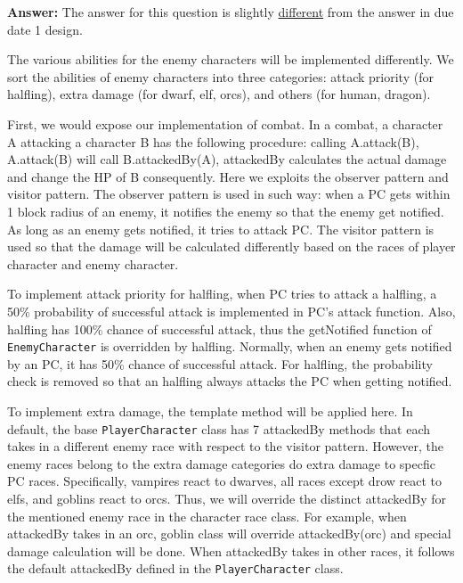 \documentclass[11pt]{article}
\theoremstyle{plain} \newtheorem{theorem*}{Theorem}[subsection]
\begin{document}
\textbf{Answer:}
The answer for this question is slightly \underline{different} from the answer 
in due date 1 design. 

The various abilities for the enemy characters will be implemented differently.
We sort the abilities of enemy characters into three categories: attack
priority (for halfling), extra damage (for dwarf, elf, orcs), and others (for
human, dragon).  

First, we would expose our implementation of combat. In a combat, a character A
attacking a character B has the following procedure: calling A.\textsf{attack}(B),
A.\textsf{attack}(B) will call B.\textsf{attackedBy}(A), \textsf{attackedBy} 
calculates the actual damage and change the HP of B consequently. Here we 
exploits the observer pattern and visitor pattern. The observer pattern is used 
in such way: when a PC gets within 1 block radius of an enemy, it notifies the 
enemy so that the enemy get notified. As long as an enemy gets notified, it 
tries to attack PC. The visitor pattern is used so that the damage will be 
calculated differently based on the races of player character and enemy character. 

To implement attack priority for halfling, when PC tries to attack a halfling,
a 50\% probability of successful attack is implemented in PC’s \textsf{attack} 
function. Also, halfling has 100\% chance of successful attack, thus the 
\textsf{getNotified} function of \texttt{EnemyCharacter} is overridden by halfling. 
Normally, when an enemy gets notified by an PC, it has 50\% chance of successful 
attack. For halfling, the probability check is removed so that an halfling always 
attacks the PC when getting notified. 

To implement extra damage, the template method will be applied here. In
default, the base \texttt{PlayerCharacter} class has 7 \textsf{attackedBy} methods 
that each takes in a different enemy race with respect to the visitor pattern. 
However, the enemy races belong to the extra damage categories do extra damage to
specfic PC races. Specifically, vampires react to dwarves, all races except
drow react to elfs, and goblins react to orcs. Thus, we will override the
distinct \textsf{attackedBy} for the mentioned enemy race in the character race 
class. For example,  when \textsf{attackedBy} takes in an orc, goblin class will 
override \textsf{attackedBy}(orc) and special damage calculation will be done. 
When \textsf{attackedBy} takes in other races, it follows the default 
\textsf{attackedBy} defined in the \texttt{PlayerCharacter} class. 
\end{document}
